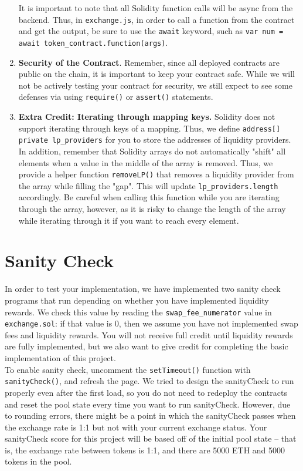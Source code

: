 \documentclass[11pt]{article}
\begin{document}
\begin{enumerate}
    It is important to note that all Solidity function calls will be async from the backend. Thus, in \texttt{exchange.js}, in order to call a function from the contract and get the output, be sure to use the \texttt{await} keyword, such as \texttt{var num = await token\_contract.function(args)}.
    
    \item \textbf{Security of the Contract}. Remember, since all deployed contracts are public on the chain, it is important to keep your contract safe. While we will not be actively testing your contract for security, we still expect to see some defenses via using \texttt{require()} or \texttt{assert()} statements. 

    \item \textbf{Extra Credit: Iterating through mapping keys.} Solidity does not support iterating through keys of a mapping. Thus, we define \texttt{address[] private lp\_providers} for you to store the addresses of liquidity providers. In addition, remember that Solidity arrays do not automatically "shift" all elements when a value in the middle of the array is removed. Thus, we provide a helper function \texttt{removeLP()} that removes a liquidity provider from the array while filling the "gap". This will update \texttt{lp\_providers.length} accordingly. Be careful when calling this function while you are iterating through the array, however, as it is risky to change the length of the array while iterating through it if you want to reach every element. 
\end{enumerate}

\section{Sanity Check}
In order to test your implementation, we have implemented two sanity check programs that run depending on whether you have implemented liquidity rewards. We check this value by reading the \texttt{swap\_fee\_numerator} value in \texttt{exchange.sol}: if that value is 0, then we assume you have not implemented swap fees and liquidity rewards. You will not receive full credit until liquidity rewards are fully implemented, but we also want to give credit for completing the basic implementation of this project. \\

To enable sanity check, uncomment the \texttt{setTimeout()} function with \texttt{sanityCheck()}, and refresh the page. We tried to design the sanityCheck to run properly even after the first load, so you do not need to redeploy the contracts and reset the pool state every time you want to run sanityCheck. However, due to rounding errors, there might be a point in which the sanityCheck passes when the exchange rate is 1:1 but not with your current exchange status. Your sanityCheck score for this project will be based off of the initial pool state -- that is, the exchange rate between tokens is 1:1, and there are 5000 ETH and 5000 tokens in the pool. 
\end{document}
